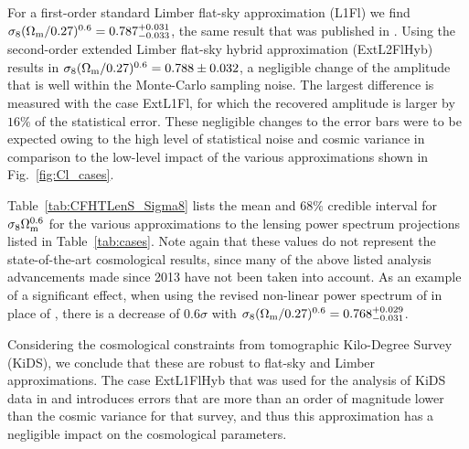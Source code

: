 For a first-order standard Limber flat-sky approximation (L1Fl) we find
$\sigma_8 (\Omega_{\rm m}/0.27)^{0.6} =0.787^{+0.031}_{-0.033}$, the same
result that was published in \cite{CFHTLenS-2pt-notomo}. Using the second-order
extended Limber flat-sky hybrid approximation (ExtL2FlHyb) results in $\sigma_8
(\Omega_{\rm m}/0.27)^{0.6} = 0.788 \pm 0.032$, a negligible change of the
amplitude that is well within the Monte-Carlo sampling noise. The largest
difference is measured with the  case ExtL1Fl, for which the
recovered amplitude is larger by $16\%$ of the statistical error. These
negligible changes to the error bars were to be expected owing to the high
level of statistical noise and cosmic variance in comparison to the low-level
impact of the various approximations shown in Fig.~\ref{fig:Cl_cases}.

Table~\ref{tab:CFHTLenS_Sigma8} lists the mean and 68\% credible interval for
$\sigma_8 \Omega_{\rm m}^{0.6}$ for the various approximations to the
lensing power spectrum projections listed in Table~\ref{tab:cases}. Note again
that these values do not represent the state-of-the-art cosmological results,
since many of the above listed analysis advancements made since 2013 have not
been taken into account. As an example of a significant effect, when using the
revised non-linear power spectrum of \cite{2012ApJ...761..152T} in place of
\cite{2003MNRAS.341.1311S}, there is a decrease of $0.6 \sigma$ with $\sigma_8
(\Omega_{\rm m}/0.27)^{0.6} = 0.768^{+0.029}_{-0.031}$.

Considering the cosmological constraints from tomographic Kilo-Degree Survey
(KiDS), we conclude that these are robust to flat-sky and Limber
approximations. The case ExtL1FlHyb that was used for the analysis of KiDS data
in \citet{KiDS-450} and \cite{joudaki/etal:2017} introduces errors that are
more than an order of magnitude lower than the cosmic variance for that survey,
and thus this approximation has a negligible impact on the cosmological
parameters.



